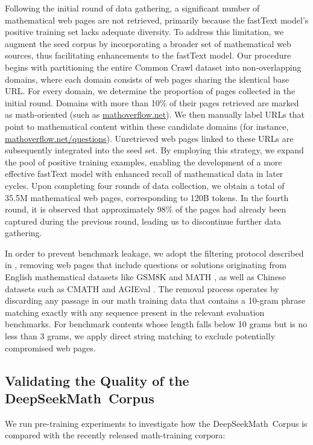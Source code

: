 \begin{itemize}[topsep=0pt]
Following the initial round of data gathering, a significant number of mathematical web pages are not retrieved, primarily because the fastText model’s positive training set lacks adequate diversity. To address this limitation, we augment the seed corpus by incorporating a broader set of mathematical web sources, thus facilitating enhancements to the fastText model. Our procedure begins with partitioning the entire Common Crawl dataset into non-overlapping domains, where each domain consists of web pages sharing the identical base URL. For every domain, we determine the proportion of pages collected in the initial round. Domains with more than 10\% of their pages retrieved are marked as math-oriented (such as \url{mathoverflow.net}). We then manually label URLs that point to mathematical content within these candidate domains (for instance, \url{mathoverflow.net/questions}). Unretrieved web pages linked to these URLs are subsequently integrated into the seed set. By employing this strategy, we expand the pool of positive training examples, enabling the development of a more effective fastText model with enhanced recall of mathematical data in later cycles. Upon completing four rounds of data collection, we obtain a total of 35.5M mathematical web pages, corresponding to 120B tokens. In the fourth round, it is observed that approximately 98\% of the pages had already been captured during the previous round, leading us to discontinue further data gathering.

In order to prevent benchmark leakage, we adopt the filtering protocol described in \cite{deepseek-coder}, removing web pages that include questions or solutions originating from English mathematical datasets like GSM8K \citep{gsm8k} and MATH \citep{MATH}, as well as Chinese datasets such as CMATH \citep{wei2023cmath} and AGIEval \citep{agieval}. The removal process operates by discarding any passage in our math training data that contains a 10-gram phrase matching exactly with any sequence present in the relevant evaluation benchmarks. For benchmark contents whose length falls below 10 grams but is no less than 3 grams, we apply direct string matching to exclude potentially compromised web pages.

\subsection{Validating the Quality of the DeepSeekMath~Corpus}

We run pre-training experiments to investigate how the DeepSeekMath~Corpus is compared with the recently released math-training corpora:


\end{itemize}
